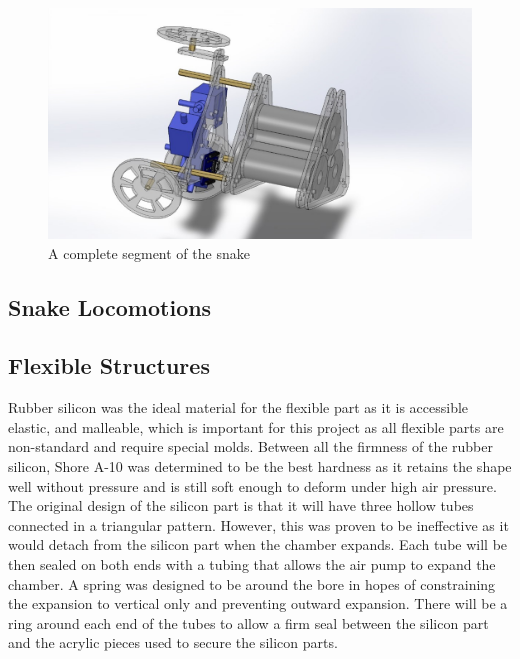 \documentclass[twoside]{article}
\begin{document}
\begin{figure}[H]
	\includegraphics{overall_structure}
	\centering
	\caption{A complete segment of the snake}
\end{figure}

\subsection{Snake Locomotions}
\blindtext
{}

\subsection{Flexible Structures}
Rubber silicon was the ideal material for the flexible part as it is accessible elastic, and malleable, which is important for this project as all flexible parts are non-standard and require special molds. Between all the firmness of the rubber silicon, Shore A-10 was determined to be the best hardness as it retains the shape well without pressure and is still soft enough to deform under high air pressure. The original design of the silicon part is that it will have three hollow tubes connected in a triangular pattern. However, this was proven to be ineffective as it would detach from the silicon part when the chamber expands. Each tube will be then sealed on both ends with a tubing that allows the air pump to expand the chamber. A spring was designed to be around the bore in hopes of constraining the expansion to vertical only and preventing outward expansion. There will be a ring around each end of the tubes to allow a firm seal between the silicon part and the acrylic pieces used to secure the silicon parts.  
\end{document}
